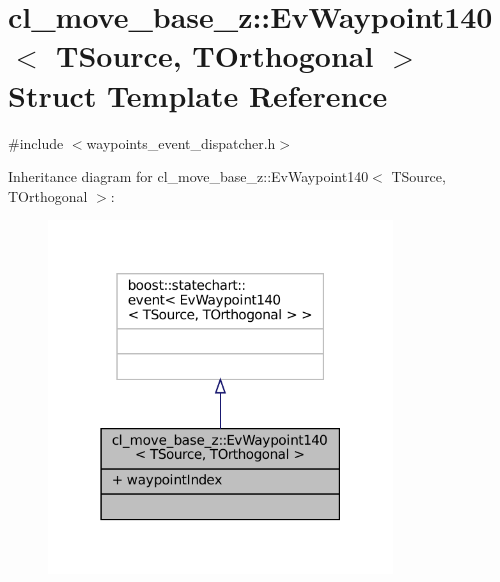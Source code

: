 \hypertarget{structcl__move__base__z_1_1EvWaypoint140}{}\section{cl\+\_\+move\+\_\+base\+\_\+z\+:\+:Ev\+Waypoint140$<$ T\+Source, T\+Orthogonal $>$ Struct Template Reference}
\label{structcl__move__base__z_1_1EvWaypoint140}


{\ttfamily \#include $<$waypoints\+\_\+event\+\_\+dispatcher.\+h$>$}



Inheritance diagram for cl\+\_\+move\+\_\+base\+\_\+z\+:\+:Ev\+Waypoint140$<$ T\+Source, T\+Orthogonal $>$\+:
\nopagebreak
\begin{figure}[H]
\begin{center}
\leavevmode
\includegraphics[width=259pt]{structcl__move__base__z_1_1EvWaypoint140__inherit__graph}
\end{center}
\end{figure}


